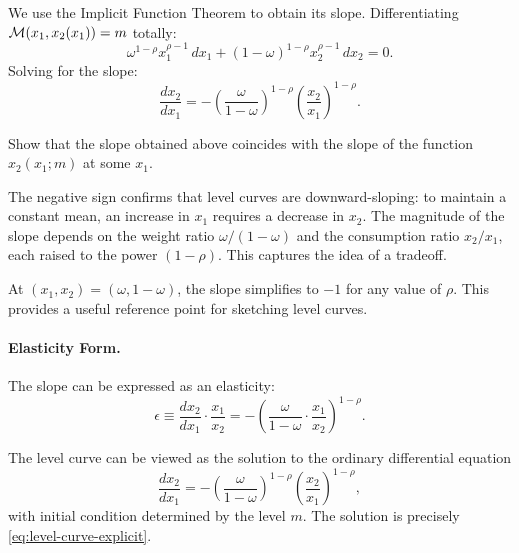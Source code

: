 We use the Implicit Function Theorem to obtain its slope. Differentiating $\mathcal{M}(x_1, x_2(x_1)) = m$ totally:
\begin{equation}
\omega^{1-\rho} x_1^{\rho-1} \, dx_1 + (1-\omega)^{1-\rho} x_2^{\rho-1} \, dx_2 = 0.
\end{equation}
Solving for the slope:
\begin{equation}
\label{eq:level-curve-slope}
\frac{dx_2}{dx_1} = -\left( \frac{\omega}{1-\omega} \right)^{1-\rho} \left( \frac{x_2}{x_1} \right)^{1-\rho}.
\end{equation}
\begin{callouttip}[Exercise]
Show that the slope obtained above coincides with the slope of the function $x_2(x_1;m)$ at some $x_1$.
\end{callouttip}
The negative sign confirms that level curves are downward-sloping: to maintain a constant mean, an increase in $x_1$ requires a decrease in $x_2$. The magnitude of the slope depends on the weight ratio $\omega/(1-\omega)$ and the consumption ratio $x_2/x_1$, each raised to the power $(1-\rho)$. This captures the idea of a tradeoff. 

\begin{calloutnote}
At $(x_1, x_2) = (\omega, 1-\omega)$, the slope simplifies to $-1$ for any value of $\rho$. This provides a useful reference point for sketching level curves.
\end{calloutnote}

\paragraph{Elasticity Form.}
The slope can be expressed as an elasticity:
\begin{equation}
\label{eq:level-curve-elasticity}
\epsilon \equiv \frac{dx_2}{dx_1} \cdot \frac{x_1}{x_2} = -\left( \frac{\omega}{1-\omega} \cdot \frac{x_1}{x_2} \right)^{1-\rho}.
\end{equation}

\begin{remark}
The level curve can be viewed as the solution to the ordinary differential equation
\[
\frac{dx_2}{dx_1} = -\left( \frac{\omega}{1-\omega} \right)^{1-\rho} \left( \frac{x_2}{x_1} \right)^{1-\rho},
\]
with initial condition determined by the level $m$. The solution is precisely \cref{eq:level-curve-explicit}.
\end{remark}

